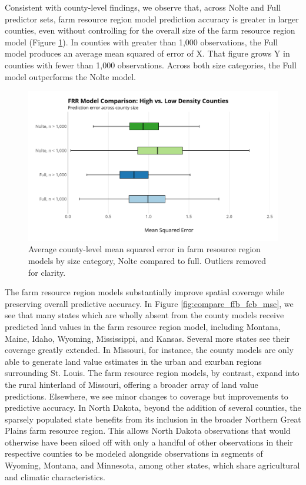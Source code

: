\documentclass[12pt]{article}
\begin{document}
Consistent with county-level findings, we observe that, across Nolte and Full predictor sets, farm resource region model prediction accuracy is greater in larger counties, even without controlling for the overall size of the farm resource region model (Figure \ref{fig:frr_compare_mse_size}). In counties with greater than 1,000 observations, the Full model produces an average mean squared of error of X. That figure grows Y in counties with fewer than 1,000 observations. Across both size categories, the Full model outperforms the Nolte model.

\begin{figure}
    \centering
    \includegraphics[width=1\textwidth]{exhibits/frr_compare_mse_size.png}
    \caption{Average county-level mean squared error in farm resource region models by size category, Nolte compared to full. Outliers removed for clarity.}
    \label{fig:frr_compare_mse_size}
\end{figure}

The farm resource region models substantially improve spatial coverage while preserving overall predictive accuracy. In Figure \ref{fig:compare_ffb_fcb_mse}, we see that many states which are wholly absent from the county models receive predicted land values in the farm resource region model, including Montana, Maine, Idaho, Wyoming, Mississippi, and Kansas. Several more states see their coverage greatly extended. In Missouri, for instance, the county models are only able to generate land value estimates in the urban and exurban regions surrounding St. Louis. The farm resource region models, by contrast, expand into the rural hinterland of Missouri, offering a broader array of land value predictions. Elsewhere, we see minor changes to coverage but improvements to predictive accuracy. In North Dakota, beyond the addition of several counties, the sparsely populated state benefits from its inclusion in the broader Northern Great Plains farm resource region. This allows North Dakota observations that would otherwise have been siloed off with only a handful of other observations in their respective counties to be modeled alongside observations in segments of Wyoming, Montana, and Minnesota, among other states, which share agricultural and climatic characteristics.
\end{document}
